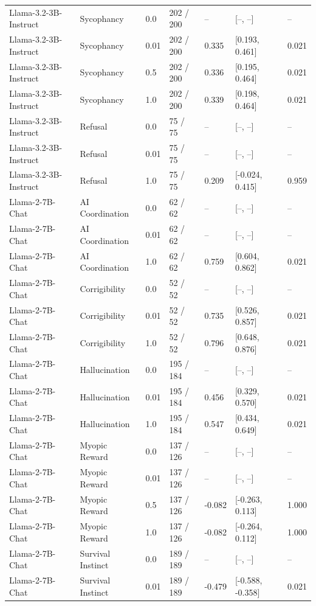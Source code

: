 \begin{table}[t]
{\begin{tabular}{lllllll}
Llama-3.2-3B-Instruct & Sycophancy & 0.0 & 202 / 200 & -- & [--, --] & -- \\
Llama-3.2-3B-Instruct & Sycophancy & 0.01 & 202 / 200 & 0.335 & [0.193, 0.461] & 0.021 \\
Llama-3.2-3B-Instruct & Sycophancy & 0.5 & 202 / 200 & 0.336 & [0.195, 0.464] & 0.021 \\
Llama-3.2-3B-Instruct & Sycophancy & 1.0 & 202 / 200 & 0.339 & [0.198, 0.464] & 0.021 \\
Llama-3.2-3B-Instruct & Refusal & 0.0 & 75 / 75 & -- & [--, --] & -- \\
Llama-3.2-3B-Instruct & Refusal & 0.01 & 75 / 75 & -- & [--, --] & -- \\
Llama-3.2-3B-Instruct & Refusal & 1.0 & 75 / 75 & 0.209 & [-0.024, 0.415] & 0.959 \\
Llama-2-7B-Chat & AI Coordination & 0.0 & 62 / 62 & -- & [--, --] & -- \\
Llama-2-7B-Chat & AI Coordination & 0.01 & 62 / 62 & -- & [--, --] & -- \\
Llama-2-7B-Chat & AI Coordination & 1.0 & 62 / 62 & 0.759 & [0.604, 0.862] & 0.021 \\
Llama-2-7B-Chat & Corrigibility & 0.0 & 52 / 52 & -- & [--, --] & -- \\
Llama-2-7B-Chat & Corrigibility & 0.01 & 52 / 52 & 0.735 & [0.526, 0.857] & 0.021 \\
Llama-2-7B-Chat & Corrigibility & 1.0 & 52 / 52 & 0.796 & [0.648, 0.876] & 0.021 \\
Llama-2-7B-Chat & Hallucination & 0.0 & 195 / 184 & -- & [--, --] & -- \\
Llama-2-7B-Chat & Hallucination & 0.01 & 195 / 184 & 0.456 & [0.329, 0.570] & 0.021 \\
Llama-2-7B-Chat & Hallucination & 1.0 & 195 / 184 & 0.547 & [0.434, 0.649] & 0.021 \\
Llama-2-7B-Chat & Myopic Reward & 0.0 & 137 / 126 & -- & [--, --] & -- \\
Llama-2-7B-Chat & Myopic Reward & 0.01 & 137 / 126 & -- & [--, --] & -- \\
Llama-2-7B-Chat & Myopic Reward & 0.5 & 137 / 126 & -0.082 & [-0.263, 0.113] & 1.000 \\
Llama-2-7B-Chat & Myopic Reward & 1.0 & 137 / 126 & -0.082 & [-0.264, 0.112] & 1.000 \\
Llama-2-7B-Chat & Survival Instinct & 0.0 & 189 / 189 & -- & [--, --] & -- \\
Llama-2-7B-Chat & Survival Instinct & 0.01 & 189 / 189 & -0.479 & [-0.588, -0.358] & 0.021 \\

\end{tabular}}
\end{table}
